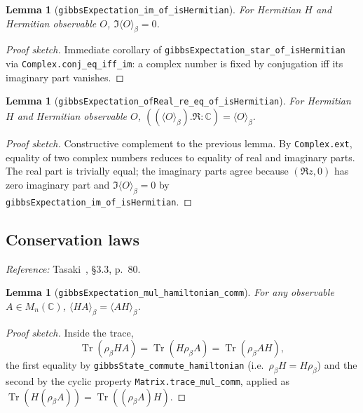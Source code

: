 \documentclass[a4paper,11pt]{article}
\newtheorem{lemma}[theorem]{Lemma}
\begin{document}
\begin{lemma}[\texttt{gibbsExpectation\_im\_of\_isHermitian}]
For Hermitian $H$ and Hermitian observable $O$,
$\Im\langle O \rangle_\beta = 0$.
\end{lemma}

\begin{proof}[Proof sketch]
Immediate corollary of
\texttt{gibbsExpectation\_star\_of\_isHermitian} via
\texttt{Complex.conj\_eq\_iff\_im}: a complex number is fixed by
conjugation iff its imaginary part vanishes.
\end{proof}

\begin{lemma}[\texttt{gibbsExpectation\_ofReal\_re\_eq\_of\_isHermitian}]
For Hermitian $H$ and Hermitian observable $O$,
$((\langle O \rangle_\beta).\Re : \mathbb{C}) = \langle O \rangle_\beta$.
\end{lemma}

\begin{proof}[Proof sketch]
Constructive complement to the previous lemma.  By
\texttt{Complex.ext}, equality of two complex numbers reduces to equality
of real and imaginary parts.  The real part is trivially equal; the
imaginary parts agree because $(\Re z, 0)$ has zero imaginary part and
$\Im\langle O \rangle_\beta = 0$ by
\texttt{gibbsExpectation\_im\_of\_isHermitian}.
\end{proof}

\subsection{Conservation laws}
\label{subsec:gibbs-conservation}

\emph{Reference:} Tasaki~\cite{Tasaki:QMB}, §3.3, p.~80.

\begin{lemma}[\texttt{gibbsExpectation\_mul\_hamiltonian\_comm}]
For any observable $A \in M_n(\mathbb{C})$,
$\langle H A \rangle_\beta = \langle A H \rangle_\beta$.
\end{lemma}

\begin{proof}[Proof sketch]
Inside the trace,
\[
  \operatorname{Tr}(\rho_\beta H A)
  = \operatorname{Tr}(H \rho_\beta A)
  = \operatorname{Tr}(\rho_\beta A H),
\]
the first equality by
\texttt{gibbsState\_commute\_hamiltonian} (i.e.\ $\rho_\beta H = H \rho_\beta$)
and the second by the cyclic property
\texttt{Matrix.trace\_mul\_comm}, applied as
$\operatorname{Tr}(H (\rho_\beta A)) = \operatorname{Tr}((\rho_\beta A) H)$.
\end{proof}
\end{document}
